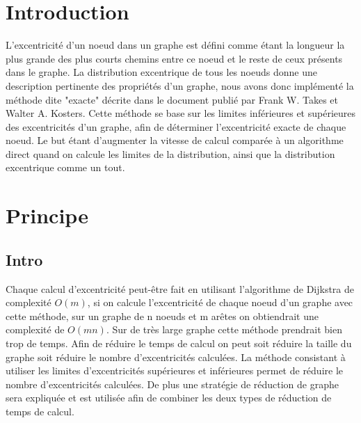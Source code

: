 \documentclass[11pt]{article}
\begin{document}
\section{Introduction}
L'excentricité d'un noeud dans un graphe est défini comme étant la longueur la plus grande des plus courts chemins entre ce noeud et le reste de ceux présents dans le graphe. La distribution excentrique de tous les noeuds donne une description pertinente des propriétés d'un graphe, nous avons donc implémenté la méthode dite "exacte" décrite dans le document publié par Frank W. Takes et Walter A. Kosters. Cette méthode se base sur les limites inférieures et supérieures des excentricités d'un graphe, afin de déterminer l'excentricité exacte de chaque noeud. Le but étant d'augmenter la vitesse de calcul comparée à un algorithme direct quand on calcule les limites de la distribution, ainsi que la distribution excentrique comme un tout.

\section{Principe}
\subsection{Intro}
Chaque calcul d'excentricité peut-être fait en utilisant l'algorithme de
Dijkstra de complexité $O(m)$, si on calcule l'excentricité de chaque noeud d'un
graphe avec cette méthode, sur un graphe de n noeuds et m arêtes on obtiendrait
une complexité de $O(mn)$. Sur de très large graphe cette méthode prendrait bien
trop de temps. Afin de réduire le temps de calcul on peut soit réduire la taille
du graphe soit réduire le nombre d'excentricités calculées. La méthode
consistant à utiliser les limites d'excentricités supérieures et inférieures
permet de réduire le nombre d'excentricités calculées. De plus une stratégie de
réduction de graphe sera expliquée et est utilisée afin de combiner les deux
types de réduction de temps de calcul.
\end{document}
